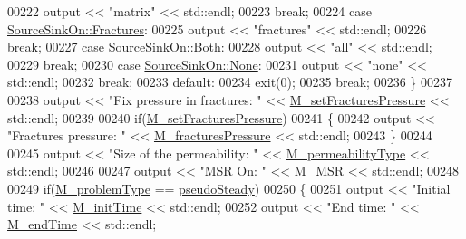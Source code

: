 \begin{DoxyCode}
00222             output << \textcolor{stringliteral}{"matrix"} << std::endl;
00223             \textcolor{keywordflow}{break};
00224         \textcolor{keywordflow}{case} \hyperlink{classFVCode3D_1_1Data_a4d66e2e205b350cb240820540339e1a3aaa3a14735ecc914d217c516ad93fb640}{SourceSinkOn::Fractures}:
00225             output << \textcolor{stringliteral}{"fractures"} << std::endl;
00226             \textcolor{keywordflow}{break};
00227         \textcolor{keywordflow}{case} \hyperlink{classFVCode3D_1_1Data_a4d66e2e205b350cb240820540339e1a3a130c5b3473c57faa76e2a1c54e26f88e}{SourceSinkOn::Both}:
00228             output << \textcolor{stringliteral}{"all"} << std::endl;
00229             \textcolor{keywordflow}{break};
00230         \textcolor{keywordflow}{case} \hyperlink{classFVCode3D_1_1Data_a4d66e2e205b350cb240820540339e1a3a6adf97f83acf6453d4a6a4b1070f3754}{SourceSinkOn::None}:
00231             output << \textcolor{stringliteral}{"none"} << std::endl;
00232             \textcolor{keywordflow}{break};
00233         \textcolor{keywordflow}{default}:
00234             exit(0);
00235             \textcolor{keywordflow}{break};
00236     \}
00237 
00238     output << \textcolor{stringliteral}{"Fix pressure in fractures: "} << \hyperlink{classFVCode3D_1_1Data_a50bb4aa8e225203af91e6221e6017549}{M\_setFracturesPressure} << std::endl;
00239 
00240     \textcolor{keywordflow}{if}(\hyperlink{classFVCode3D_1_1Data_a50bb4aa8e225203af91e6221e6017549}{M\_setFracturesPressure})
00241     \{
00242         output << \textcolor{stringliteral}{"Fractures pressure: "} << \hyperlink{classFVCode3D_1_1Data_af04c830d4b03507186fbd36ad0ffcb2c}{M\_fracturesPressure} << std::endl;
00243     \}
00244 
00245     output << \textcolor{stringliteral}{"Size of the permeability: "} << \hyperlink{classFVCode3D_1_1Data_a313a43a63768026ac108106fa90113c9}{M\_permeabilityType} << std::endl;
00246 
00247     output << \textcolor{stringliteral}{"MSR On: "} << \hyperlink{classFVCode3D_1_1Data_a79a937025567c594d491124fdd7371d1}{M\_MSR} << std::endl;
00248 
00249     \textcolor{keywordflow}{if}(\hyperlink{classFVCode3D_1_1Data_a7d31023f4e0ca0377503c0a74797c5b3}{M\_problemType} == \hyperlink{classFVCode3D_1_1Data_af17933074f5acdb699179763e6f43f23adf310b8b79bf5a11843828488cb3b46f}{pseudoSteady})
00250     \{
00251         output << \textcolor{stringliteral}{"Initial time: "} << \hyperlink{classFVCode3D_1_1Data_ab4a94e00bef44eb2195783ffa4682cf0}{M\_initTime} << std::endl;
00252         output << \textcolor{stringliteral}{"End time: "} << \hyperlink{classFVCode3D_1_1Data_ad0db1011dedc7485e6b4393c872506c0}{M\_endTime} << std::endl;

\end{DoxyCode}
